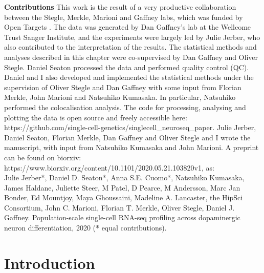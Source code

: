 \begin{Abstract}

\hspace{-3mm}\textbf{Contributions} This work is the result of a very productive collaboration between the Stegle, Merkle, Marioni and Gaffney labs, which was funded by Open Targets \cite{}.
The data was generated by Dan Gaffney’s lab at the Wellcome Trust Sanger Institute, and the experiments were largely led by Julie Jerber, who also contributed to the interpretation of the results. 
The statistical methods and analyses described in this chapter were co-supervised by Dan Gaffney and Oliver Stegle. 
Daniel Seaton processed the data and performed quality control (QC). 
Daniel and I also developed and implemented the statistical methods under the supervision of Oliver Stegle and Dan Gaffney with some input from Florian Merkle, John Marioni and Natsuhiko Kumasaka.
In particular, Natsuhiko performed the colocalisation analysis.
The code for processing, analysing and plotting the data is open source and freely accessible here: https://github.com/single-cell-genetics/singlecell\_neuroseq\_paper.
Julie Jerber, Daniel Seaton, Florian Merkle, Dan Gaffney and Oliver Stegle and I wrote the manuscript, with input from Natsuhiko Kumasaka and John Marioni.
A preprint \cite{jerber2020population} can be found on biorxiv: https://www.biorxiv.org/content/10.1101/2020.05.21.103820v1, as:\\

Julie Jerber*, Daniel D. Seaton*, Anna S.E. Cuomo*, Natsuhiko Kumasaka, James Haldane, Juliette Steer, M Patel, D Pearce, M Andersson, Marc Jan Bonder, Ed Mountjoy, Maya Ghoussaini, Madeline A. Lancaster, the HipSci Consortium, John C. Marioni, Florian T. Merkle, Oliver Stegle, Daniel J. Gaffney. Population-scale single-cell RNA-seq profiling across dopaminergic neuron differentiation, 2020 (* equal contributions).

\end{Abstract}

\section{Introduction}

